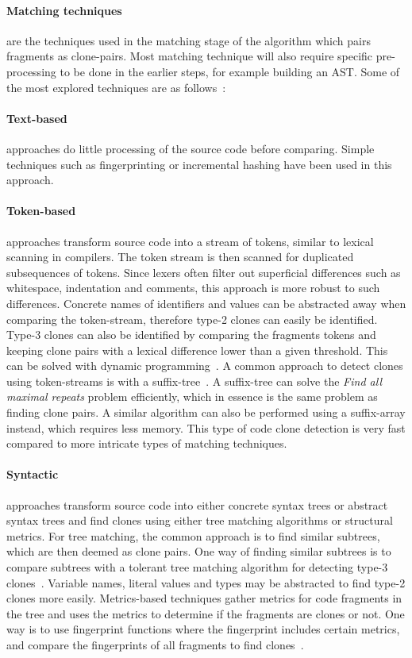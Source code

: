 \paragraph{Matching techniques} are the techniques used in the matching stage of the
algorithm which pairs fragments as clone-pairs. Most matching technique will also require
specific pre-processing to be done in the earlier steps, for example building an AST. Some
of the most explored techniques are as follows~\cite{ComparisonAndEvaluationOfTechniques}:

\paragraph{Text-based} approaches do little processing of the source code before
comparing. Simple techniques such as fingerprinting or incremental hashing have been used
in this approach. 

\paragraph{Token-based} approaches transform source code into a stream of tokens, similar
to lexical scanning in compilers. The token stream is then scanned for duplicated
subsequences of tokens. Since lexers often filter out superficial differences
such as whitespace, indentation and comments, this approach is more robust to such
differences. Concrete names of identifiers and values can be abstracted away when
comparing the token-stream, therefore type-2 clones can easily be identified. Type-3
clones can also be identified by comparing the fragments tokens and keeping clone pairs
with a lexical difference lower than a given threshold. This can be solved with dynamic
programming~\cite{BakerSparseDynamicProgramming}. A common approach to detect clones using
token-streams is with a suffix-tree~\cite{Bakerdup}. A suffix-tree can solve
the \textit{Find all maximal repeats} problem efficiently, which in essence is the same
problem as finding clone pairs. A similar algorithm can also be performed using a suffix-array
instead, which requires less memory. This type of code clone detection is very fast
compared to more intricate types of matching techniques.

\paragraph{Syntactic} approaches transform source code into either concrete syntax trees
or abstract syntax trees and find clones using either tree matching algorithms or
structural metrics. For tree matching, the common approach is to find similar subtrees,
which are then deemed as clone pairs. One way of finding similar subtrees is to compare
subtrees with a tolerant tree matching algorithm for detecting type-3
clones~\cite{ASTCloneDetection}. Variable names, literal values and types may be
abstracted to find type-2 clones more easily. Metrics-based techniques gather metrics for
code fragments in the tree and uses the metrics to determine if the fragments are clones
or not. One way is to use fingerprint functions where the fingerprint includes certain
metrics, and compare the fingerprints of all fragments to find clones~\cite{Deckard}.

